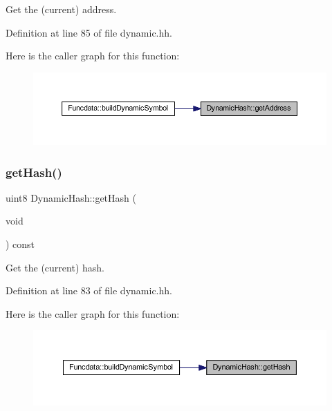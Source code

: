 Get the (current) address. 



Definition at line 85 of file dynamic.\+hh.

Here is the caller graph for this function\+:
\nopagebreak
\begin{figure}[H]
\begin{center}
\leavevmode
\includegraphics[width=350pt]{class_dynamic_hash_a304ee882e7ad7f4edd33bda810622cb2_icgraph}
\end{center}
\end{figure}
\mbox{\label{class_dynamic_hash_ae25a2b1eca6a505bcb4e97b67eb1b2e7}} 
\subsubsection{\texorpdfstring{getHash()}{getHash()}}
{\footnotesize\ttfamily uint8 Dynamic\+Hash\+::get\+Hash (\begin{DoxyParamCaption}\item[{void}]{ }\end{DoxyParamCaption}) const\hspace{0.3cm}{\ttfamily [inline]}}



Get the (current) hash. 



Definition at line 83 of file dynamic.\+hh.

Here is the caller graph for this function\+:
\nopagebreak
\begin{figure}[H]
\begin{center}
\leavevmode
\includegraphics[width=350pt]{class_dynamic_hash_ae25a2b1eca6a505bcb4e97b67eb1b2e7_icgraph}
\end{center}
\end{figure}
\mbox{\label{class_dynamic_hash_a670928958cd93677cc459e9b4f063fd3}} 
